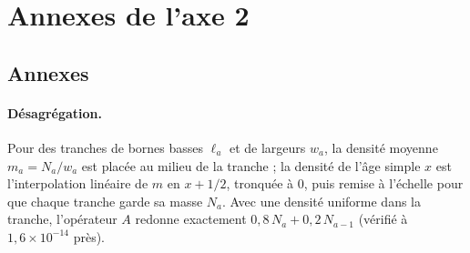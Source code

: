 \section{Annexes de l'axe 2}
\subsection{Annexes}
\paragraph{Désagrégation.} Pour des tranches de bornes basses $\ell_a$ et de largeurs $w_a$, la densité
moyenne $m_a = N_a / w_a$ est placée au milieu de la tranche ; la densité de l'âge simple $x$ est
l'interpolation linéaire de $m$ en $x + 1/2$, tronquée à 0, puis remise à l'échelle pour que chaque
tranche garde sa masse $N_a$. Avec une densité uniforme dans la tranche, l'opérateur $A$ redonne
exactement $0{,}8\,N_a + 0{,}2\,N_{a-1}$ (vérifié à $1{,}6 \times 10^{-14}$\mesure{} près).
